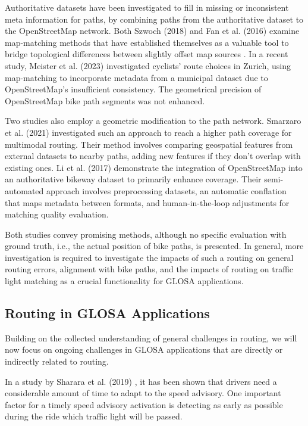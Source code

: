 Authoritative datasets have been investigated to fill in missing or inconsistent meta information for paths, by combining paths from the authoritative dataset to the OpenStreetMap network. Both Szwoch (2018) \cite{szwoch_combining_2019} and Fan et al. (2016) \cite{fan_polygon-based_2016} examine map-matching methods that have established themselves as a valuable tool to bridge topological differences between slightly offset map sources \cite{chao_survey_2020}. In a recent study, Meister et al. (2023) \cite{meister_route_2023} investigated cyclists' route choices in Zurich, using map-matching to incorporate metadata from a municipal dataset due to OpenStreetMap's insufficient consistency. The geometrical precision of OpenStreetMap bike path segments was not enhanced.

Two studies also employ a geometric modification to the path network. Smarzaro et al. (2021) \cite{smarzaro_creation_2021} investigated such an approach to reach a higher path coverage for multimodal routing. Their method involves comparing geospatial features from external datasets to nearby paths, adding new features if they don't overlap with existing ones. Li et al. (2017) \cite{li_optimized_2017} demonstrate the integration of OpenStreetMap into an authoritative bikeway dataset to primarily enhance coverage. Their semi-automated approach involves preprocessing datasets, an automatic conflation that maps metadata between formats, and human-in-the-loop adjustments for matching quality evaluation. 

Both studies convey promising methods, although no specific evaluation with ground truth, i.e., the actual position of bike paths, is presented. In general, more investigation is required to investigate the impacts of such a routing on general routing errors, alignment with bike paths, and the impacts of routing on traffic light matching as a crucial functionality for GLOSA applications.

\subsection{Routing in GLOSA Applications}

Building on the collected understanding of general challenges in routing, we will now focus on ongoing challenges in GLOSA applications that are directly or indirectly related to routing.

In a study by Sharara et al. (2019) \cite{sharara_impact_2019}, it has been shown that drivers need a considerable amount of time to adapt to the speed advisory. One important factor for a timely speed advisory activation is detecting as early as possible during the ride which traffic light will be passed. 

